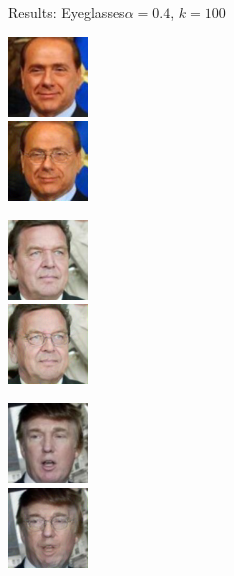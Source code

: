 \documentclass[11pt]{beamer}
\begin{document}

\begin{frame}{Results: Eyeglasses}{$\alpha=0.4$, $k=100$}
	\centering
	\begin{minipage}{81px}
		\includegraphics[width=80px]{../pictures/outputs/start-imgs/Berlusconi.png}\\
		\includegraphics[width=80px]{../pictures/outputs/eyeglasses_alpha0.4_k100/Berlusconi.png}
	\end{minipage}%
	\begin{minipage}{81px}
		\includegraphics[width=80px]{../pictures/outputs/start-imgs/Schroeder.png}\\
		\includegraphics[width=80px]{../pictures/outputs/eyeglasses_alpha0.4_k100/Schroeder.png}
	\end{minipage}%
	\begin{minipage}{81px}
		\includegraphics[width=80px]{../pictures/outputs/start-imgs/Trump.png}\\
		\includegraphics[width=80px]{../pictures/outputs/eyeglasses_alpha0.4_k100/Trump.png}

\end{minipage}
\end{frame}
\end{document}
